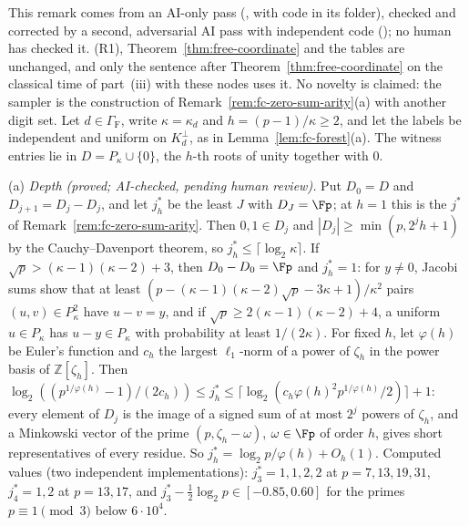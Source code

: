 
\begin{remark}
\label{rem:fc-witness-h3}
This remark comes from an AI-only pass (, with code in its folder), checked and corrected by a second, adversarial AI pass with independent code (); no human has checked it. (R1), Theorem~\ref{thm:free-coordinate} and the tables are unchanged, and only the sentence after Theorem~\ref{thm:free-coordinate} on the classical time of part~(iii) with these nodes uses it. No novelty is claimed: the sampler is the construction of Remark~\ref{rem:fc-zero-sum-arity}(a) with another digit set. Let $d \in \Gamma_{\mathrm F}$, write $\kappa = \kappa_d$ and $h = (p-1)/\kappa \ge 2$, and let the labels be independent and uniform on $K_d^\perp$, as in Lemma~\ref{lem:fc-forest}(a). The witness entries lie in $D = P_\kappa\cup\{0\}$, the $h$-th roots of unity together with $0$.

\textup{(a)} \emph{Depth (proved; AI-checked, pending human review).} Put $D_0 = D$ and $D_{j+1} = D_j - D_j$, and let $j^*_h$ be the least $J$ with $D_J = \Fp$; at $h = 1$ this is the $j^*$ of Remark~\ref{rem:fc-zero-sum-arity}. Then $0, 1 \in D_j$ and $|D_j| \ge \min(p, 2^jh+1)$ by the Cauchy--Davenport theorem, so $j^*_h \le \lceil\log_2\kappa\rceil$. If $\sqrt p > (\kappa-1)(\kappa-2)+3$, then $D_0 - D_0 = \Fp$ and $j^*_h = 1$: for $y \ne 0$, Jacobi sums show that at least $(p - (\kappa-1)(\kappa-2)\sqrt p - 3\kappa + 1)/\kappa^2$ pairs $(u,v) \in P_\kappa^2$ have $u - v = y$, and if $\sqrt p \ge 2(\kappa-1)(\kappa-2)+4$, a uniform $u \in P_\kappa$ has $u - y \in P_\kappa$ with probability at least $1/(2\kappa)$. For fixed $h$, let $\varphi(h)$ be Euler's function and $c_h$ the largest $\ell_1$-norm of a power of $\zeta_h$ in the power basis of $\mathbb{Z}[\zeta_h]$. Then $\log_2((p^{1/\varphi(h)}-1)/(2c_h)) \le j^*_h \le \lceil\log_2(c_h\varphi(h)^2p^{1/\varphi(h)}/2)\rceil + 1$: every element of $D_j$ is the image of a signed sum of at most $2^j$ powers of $\zeta_h$, and a Minkowski vector of the prime $(p,\zeta_h-\omega)$, $\omega \in \Fp$ of order $h$, gives short representatives of every residue. So $j^*_h = \log_2p/\varphi(h) + O_h(1)$. Computed values (two independent implementations): $j^*_3 = 1,1,2,2$ at $p = 7,13,19,31$, $j^*_4 = 1,2$ at $p = 13,17$, and $j^*_3 - \tfrac12\log_2p \in [-0.85, 0.60]$ for the primes $p \equiv 1 \pmod 3$ below $6\cdot 10^4$.


\end{remark}
